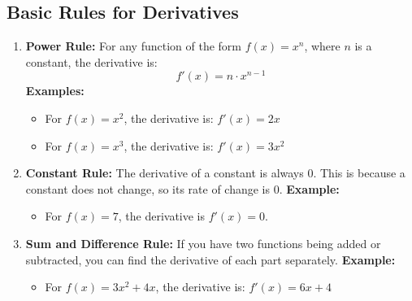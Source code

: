 \begin{itemize}
    \begin{center}
    \end{center}
\end{itemize}


\subsection{Basic Rules for Derivatives}
\begin{enumerate}
    \item \textbf{Power Rule:} For any function of the form $f(x) = x^n$, where $n$ is a constant, the derivative is:
    \[ f'(x) = n \cdot x^{n-1} \]
    \textbf{Examples:}
    \begin{itemize}
        \item For $f(x) = x^2$, the derivative is: $f'(x) = 2x$
        \item For $f(x) = x^3$, the derivative is: $f'(x) = 3x^2$
    \end{itemize}
    
    \item \textbf{Constant Rule:} The derivative of a constant is always 0. This is because a constant does not change, so its rate of change is 0.
    \textbf{Example:}
    \begin{itemize}
        \item For $f(x) = 7$, the derivative is $f'(x) = 0$.
    \end{itemize}
    
    \item \textbf{Sum and Difference Rule:} If you have two functions being added or subtracted, you can find the derivative of each part separately.
    \textbf{Example:}
    \begin{itemize}
        \item For $f(x) = 3x^2 + 4x$, the derivative is: $f'(x) = 6x + 4$
    \end{itemize}
\end{enumerate}

